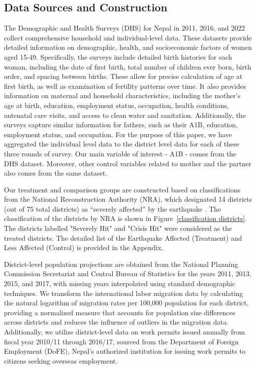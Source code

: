 \documentclass[11pt,a4paper]{article}
\begin{document}
\vspace{0.25cm}

\subsection{Data Sources and Construction}
The Demographic and Health Surveys (DHS) for Nepal in 2011, 2016, and 2022 collect comprehensive household and individual-level data. These datasets provide detailed information on demographic, health, and socioeconomic factors of women aged 15-49. Specifically, the surveys include detailed birth histories for each woman, including the date of first birth, total number of children ever born, birth order, and spacing between births. These allow for precise calculation of age at first birth, as well as examination of fertility patterns over time. It also provides information on  maternal and household characteristics, including the mother's age at birth, education, employment status, occupation, health conditions, antenatal care visits, and access to clean water and sanitation. Additionally, the surveys capture similar information for fathers, such as their A1B, education, employment status, and occupation. For the purpose of this paper, we have aggregated the individual level data to the district level data for each of these three rounds of survey. Our main variable of interest - A1B - comes from the DHS dataset. Moreover, other control variables related to mother and the partner also comes from the same dataset.

\vspace{0.25 cm}

Our treatment and comparison groups are constructed based on classifications from the National Reconstruction Authority (NRA), which designated 14 districts (out of 75 total districts) as ``severely affected'' by the earthquake \citep{npc2015}. The classification of the districts by NRA is shown in Figure~\ref{classification districts}. The districts labelled "Severely Hit" and "Crisis Hit" were considered as the treated districts. The detailed list of the Earthquake Affected (Treatment) and Less Affected (Control) is provided in the Appendix.


\vspace{0.25 cm}


District-level population projections are obtained from the National Planning Commission Secretariat and Central Bureau of Statistics for the years 2011, 2013, 2015, and 2017, with missing years interpolated using standard demographic techniques. We transform the international labor migration data by calculating the natural logarithm of migration rates per 100,000 population for each district, providing a normalized measure that accounts for population size differences across districts and reduces the influence of outliers in the migration data. Additionally, we utilize district-level data on work permits issued annually from fiscal year 2010/11 through 2016/17, sourced from the Department of Foreign Employment (DoFE), Nepal's authorized institution for issuing work permits to citizens seeking overseas employment. 
\end{document}
